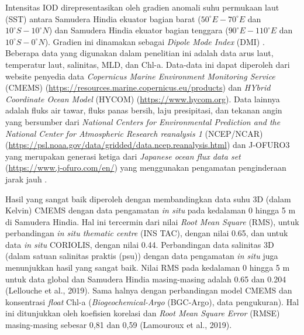 \begin{spacing}{1.5}
	Intensitas IOD direpresentasikan oleh gradien anomali suhu permukaan laut (SST) antara Samudera Hindia ekuator bagian barat ($50^\circ E-70^\circ E$ dan $10^\circ S-10^\circ N$) dan Samudera Hindia ekuator bagian tenggara ($90^\circ E-110^\circ E$ dan $10^\circ S-0^\circ N$). Gradien ini dinamakan sebagai \textit{Dipole Mode Index} (DMI) \cite{Jiang2021,Dwivedi2012}. Beberapa data yang digunakan dalam penelitian ini adalah data arus laut, temperatur laut, salinitas, MLD, dan Chl-a. Data-data ini dapat diperoleh dari website penyedia data \textit{Copernicus Marine Environment Monitoring Service} (CMEMS) (\href{https://resources.marine.copernicus.eu/products}{https://resources.marine.copernicus.eu/products}) dan \textit{HYbrid Coordinate Ocean Model} (HYCOM) (\href{https://www.hycom.org}{https://www.hycom.org}). Data lainnya adalah fluks air tawar, fluks panas bersih, laju presipitasi, dan tekanan angin yang bersumber dari \textit{National Centers for Environmental Prediction and the National Center for Atmospheric Research reanalysis 1} (NCEP/NCAR) (\href{https://psl.noaa.gov/data/gridded/data.ncep.reanalysis.html}{https://psl.noaa.gov/data/gridded/data.ncep.reanalysis.html})  \cite{Kalnay1996} dan J-OFURO3 yang merupakan generasi ketiga dari \textit{Japanese ocean flux data set} (\href{https://www.j-ofuro.com/en/}{https://www.j-ofuro.com/en/}) yang menggunakan pengamatan penginderaan jarak jauh \cite{Tomita2019}. 
	
	Hasil yang sangat baik diperoleh dengan membandingkan data suhu 3D (dalam Kelvin) CMEMS dengan data pengamatan \textit{in situ} pada kedalaman 0 hingga 5 m di Samudera Hindia. Hal ini tercermin dari nilai \textit{Root Mean Square} (RMS), untuk perbandingan \textit{in situ thematic centre} (INS TAC), dengan nilai 0.65, dan untuk data \textit{in situ} CORIOLIS, dengan nilai 0.44. Perbandingan data salinitas 3D (dalam satuan salinitas praktis (psu)) dengan data pengamatan \textit{in situ} juga menunjukkan hasil yang sangat baik. Nilai RMS pada kedalaman 0 hingga 5 m untuk data global dan Samudera Hindia masing-masing adalah 0.65 dan 0.204 (Lellouche et al., 2019). Sama halnya dengan perbandingan model CMEMS dan konsentrasi \textit{float} Chl-a (\textit{Biogeochemical-Argo} (BGC-Argo), data pengukuran). Hal ini ditunjukkan oleh koefisien korelasi dan \textit{Root Mean Square Error} (RMSE) masing-masing sebesar 0,81 dan 0,59 (Lamouroux et al., 2019).   
	

\end{spacing}
